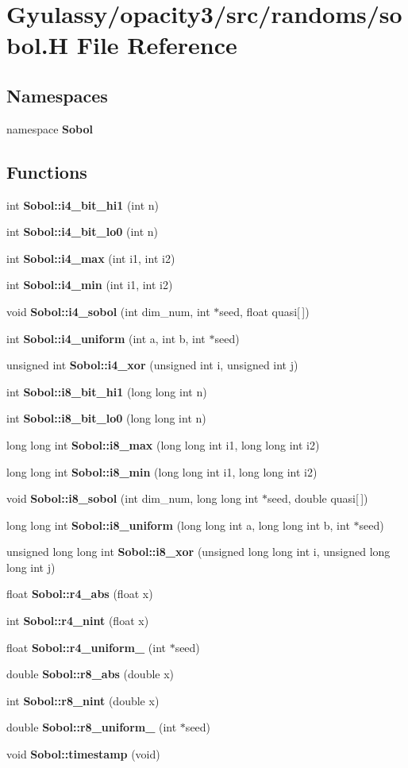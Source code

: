 \section{Gyulassy/opacity3/src/randoms/sobol.H File Reference}
\label{sobol_8H}
\subsection*{Namespaces}
\begin{CompactItemize}
\item 
namespace {\bf Sobol}
\end{CompactItemize}
\subsection*{Functions}
\begin{CompactItemize}
\item 
int {\bf Sobol::i4\_\-bit\_\-hi1} (int n)
\item 
int {\bf Sobol::i4\_\-bit\_\-lo0} (int n)
\item 
int {\bf Sobol::i4\_\-max} (int i1, int i2)
\item 
int {\bf Sobol::i4\_\-min} (int i1, int i2)
\item 
void {\bf Sobol::i4\_\-sobol} (int dim\_\-num, int $\ast$seed, float quasi[$\,$])
\item 
int {\bf Sobol::i4\_\-uniform} (int a, int b, int $\ast$seed)
\item 
unsigned int {\bf Sobol::i4\_\-xor} (unsigned int i, unsigned int j)
\item 
int {\bf Sobol::i8\_\-bit\_\-hi1} (long long int n)
\item 
int {\bf Sobol::i8\_\-bit\_\-lo0} (long long int n)
\item 
long long int {\bf Sobol::i8\_\-max} (long long int i1, long long int i2)
\item 
long long int {\bf Sobol::i8\_\-min} (long long int i1, long long int i2)
\item 
void {\bf Sobol::i8\_\-sobol} (int dim\_\-num, long long int $\ast$seed, double quasi[$\,$])
\item 
long long int {\bf Sobol::i8\_\-uniform} (long long int a, long long int b, int $\ast$seed)
\item 
unsigned long long int {\bf Sobol::i8\_\-xor} (unsigned long long int i, unsigned long long int j)
\item 
float {\bf Sobol::r4\_\-abs} (float x)
\item 
int {\bf Sobol::r4\_\-nint} (float x)
\item 
float {\bf Sobol::r4\_\-uniform\_} (int $\ast$seed)
\item 
double {\bf Sobol::r8\_\-abs} (double x)
\item 
int {\bf Sobol::r8\_\-nint} (double x)
\item 
double {\bf Sobol::r8\_\-uniform\_} (int $\ast$seed)
\item 
void {\bf Sobol::timestamp} (void)
\end{CompactItemize}
